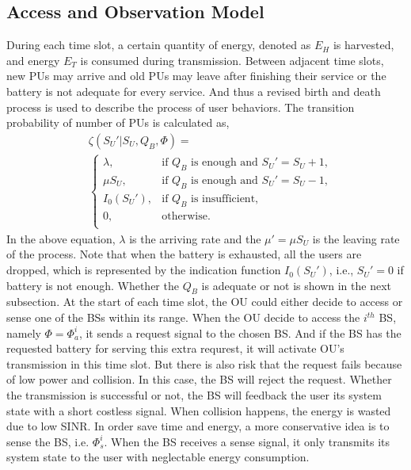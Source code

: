 \documentclass[conference]{IEEEtran}
\begin{document}
\subsection{Access and Observation Model}
During each time slot, a certain quantity of energy, denoted as \(E_H\) is harvested,
and energy \(E_T\) is consumed during transmission.
Between adjacent time slots, new PUs may arrive and
old PUs may leave after finishing their service or the battery is not adequate for every service.
And thus a revised birth and death process is used to describe the process of user behaviors.
The transition probability of number of PUs is calculated as,
\begin{align}\label{formula1}
&\zeta\left(S_U'| S_U, Q_B, \Phi\right) = \nonumber\\
&\begin{cases}
	\lambda, &\mbox{if $Q_B$ is enough and $S_U' = S_U + 1$,}\\
	\mu S_U, &\mbox{if $Q_B$ is enough and $S_U' = S_U - 1$,}\\
	I_0\left(S_U'\right), &\mbox{if $Q_B$ is insufficient,}\\
	0, &\mbox{otherwise.}\\
\end{cases}
\end{align}
In the above equation, \(\lambda\) is the arriving rate and the \(\mu' = \mu S_U\) is the leaving rate of the process.
Note that when the battery is exhausted, all the users are dropped,
which is represented by the indication function \(I_0\left(S_U'\right)\),
i.e., \(S_U' = 0\) if battery is not enough.
Whether the \(Q_B\) is adequate or not is shown in the next subsection.
At the start of each time slot,
the OU could either decide to access or sense one of the BSs within its range.
When the OU decide to access the \(i^{th}\) BS, namely \(\Phi = \Phi_{a}^i\),
it sends a request signal to the chosen BS.
And if the BS has the requested battery for serving this extra requrest,
it will activate OU's transmission in this time slot.
But there is also risk that the request fails because of low power and collision.
In this case, the BS will reject the request.
Whether the transmission is successful or not, the BS will feedback the user its system state with a short costless signal.
When collision happens, the energy is wasted due to low SINR.
In order save time and energy, a more conservative idea is to sense the BS, i.e. \(\Phi_{s}^i\).
When the BS receives a sense signal,
it only transmits its system state to the user with neglectable energy consumption.
\end{document}
